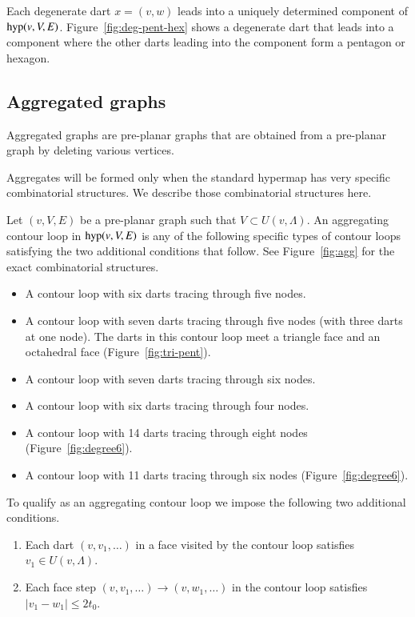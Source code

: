 Each degenerate dart $x=(v,w)$ leads into a uniquely determined
component of ${\operatorname{hyp}}(v,V,E)$.  
Figure~\ref{fig:deg-pent-hex} %
shows a degenerate dart that leads into a component where
the other darts leading into the component form a pentagon
or hexagon.


\subsection{Aggregated graphs}
\label{sec:stargraph}


Aggregated graphs are pre-planar graphs that are obtained from
a pre-planar graph by deleting various vertices.  

Aggregates will be formed only when the standard hypermap has
very specific combinatorial structures.  We describe those
combinatorial structures here.

\begin{definition}
Let $(v,V,E)$ be a pre-planar graph such that $V\subset U(v,\Lambda)$.
An aggregating contour loop in ${\operatorname{hyp}}(v,V,E)$ 
is any of the following specific
types of contour loops satisfying the 
two additional conditions that follow.
See Figure~\ref{fig:agg} %
for the exact combinatorial structures.
\begin{itemize}
\item A contour loop with six darts tracing through five nodes. 
\item A contour loop with seven darts tracing through five nodes (with three
  darts at one node).
   The darts in this contour loop
   meet a triangle face and an octahedral face (Figure~\ref{fig:tri-pent}). 
\item A contour loop with seven darts tracing through six nodes.
\item A contour loop with six darts tracing through four nodes. 
\item A contour loop with 14 darts tracing through eight nodes
   (Figure~\ref{fig:degree6}). %
\item A contour loop with 11 darts tracing through six nodes %
   (Figure~\ref{fig:degree6}).
\end{itemize}
To qualify as an aggregating 
contour loop we impose the following two additional conditions.
\begin{enumerate}
\item Each dart $(v,v_1,\ldots)$ in a face visited by the contour 
loop satisfies $v_1\in U(v,\Lambda)$.
\item Each face step $(v,v_1,\ldots)\to (v,w_1,\ldots)$ in the contour
loop satisfies $|v_1-w_1|\le 2t_0$.
\end{enumerate}
\end{definition}

